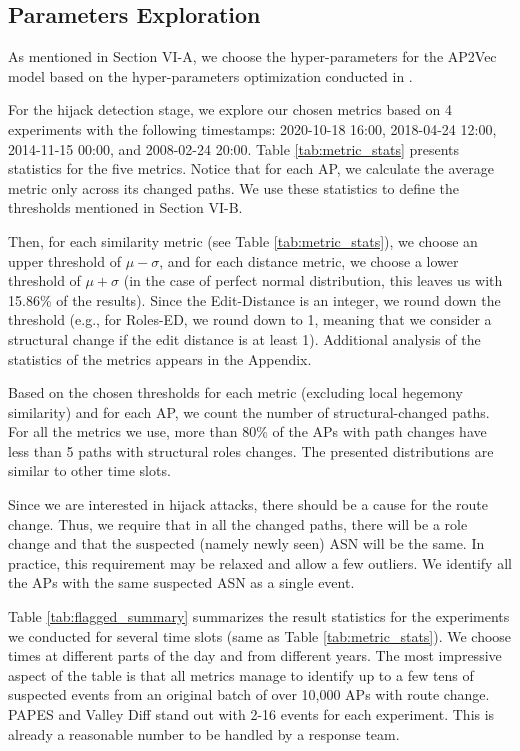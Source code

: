 \documentclass[10pt,journal]{IEEEtran}
\begin{document}
\subsection{Parameters Exploration}
As mentioned in Section VI-A, we choose the hyper-parameters for the AP2Vec model based on the hyper-parameters optimization conducted in \cite{shapira2020deep}.

For the hijack detection stage, we explore our chosen metrics based on 4 experiments with the following timestamps: 2020-10-18 16:00, 2018-04-24 12:00, 2014-11-15 00:00, and 2008-02-24 20:00. Table \ref{tab:metric_stats} presents statistics for the five metrics. Notice that for each AP, we calculate the average metric only across its changed paths. We use these statistics to define the thresholds mentioned in Section VI-B.

Then, for each similarity metric (see Table \ref{tab:metric_stats}), we choose an upper threshold of $\mu-\sigma$, and for each distance metric, we choose a lower threshold of $\mu+\sigma$ (in the case of perfect normal distribution, this leaves us with 15.86\% of the results). Since the Edit-Distance is an integer, we round down the threshold (e.g., for Roles-ED, we round down to 1, meaning that we consider a structural change if the edit distance is at least 1). Additional analysis of the statistics of the metrics appears in the Appendix.

Based on the chosen thresholds for each metric (excluding local hegemony similarity) and for each AP, we count the number of structural-changed paths. For all the metrics we use, more than 80\% of the APs with path changes have less than 5 paths with structural roles changes. The presented distributions are similar to other time slots.

Since we are interested in hijack attacks, there should be a cause for the route change. Thus, we require that in all the changed paths, there will be a role change and that the suspected (namely newly seen) ASN will be the same. In practice, this requirement may be relaxed and allow a few outliers. We identify all the APs with the same suspected ASN as a single event.

Table \ref{tab:flagged_summary} summarizes the result statistics for the experiments we conducted for several time slots (same as Table \ref{tab:metric_stats}). We choose times at different parts of the day and from different years. The most impressive aspect of the table is that all metrics manage to identify up to a few tens of suspected events from an original batch of over 10,000 APs with route change. PAPES and Valley Diff stand out with 2-16 events for each experiment. This is already a reasonable number to be handled by a response team.
\end{document}
